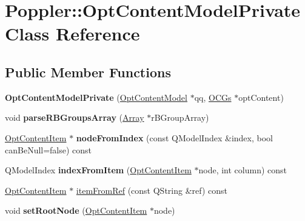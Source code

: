 \hypertarget{class_poppler_1_1_opt_content_model_private}{}\section{Poppler\+:\+:Opt\+Content\+Model\+Private Class Reference}
\label{class_poppler_1_1_opt_content_model_private}
\subsection*{Public Member Functions}
\begin{DoxyCompactItemize}
\item 
\mbox{\label{class_poppler_1_1_opt_content_model_private_a9278859a1265add35b51c51d6019da1e}} 
{\bfseries Opt\+Content\+Model\+Private} (\hyperlink{class_poppler_1_1_opt_content_model}{Opt\+Content\+Model} $\ast$qq, \hyperlink{class_o_c_gs}{O\+C\+Gs} $\ast$opt\+Content)
\item 
\mbox{\label{class_poppler_1_1_opt_content_model_private_ae8ef7bb0e42d99c6a9fc3e884e92d516}} 
void {\bfseries parse\+R\+B\+Groups\+Array} (\hyperlink{class_array}{Array} $\ast$r\+B\+Group\+Array)
\item 
\mbox{\label{class_poppler_1_1_opt_content_model_private_a6db13389af2775cc71da453e7b80dde7}} 
\hyperlink{class_poppler_1_1_opt_content_item}{Opt\+Content\+Item} $\ast$ {\bfseries node\+From\+Index} (const Q\+Model\+Index \&index, bool can\+Be\+Null=false) const
\item 
\mbox{\label{class_poppler_1_1_opt_content_model_private_a70c4327a9faaeb97f629c9f77cc4bcf1}} 
Q\+Model\+Index {\bfseries index\+From\+Item} (\hyperlink{class_poppler_1_1_opt_content_item}{Opt\+Content\+Item} $\ast$node, int column) const
\item 
\hyperlink{class_poppler_1_1_opt_content_item}{Opt\+Content\+Item} $\ast$ \hyperlink{class_poppler_1_1_opt_content_model_private_a4f7f8ce316e9141b44363a2f3e64fa9a}{item\+From\+Ref} (const Q\+String \&ref) const
\item 
\mbox{\label{class_poppler_1_1_opt_content_model_private_abcef1a8001d7e6651273166ef840d4df}} 
void {\bfseries set\+Root\+Node} (\hyperlink{class_poppler_1_1_opt_content_item}{Opt\+Content\+Item} $\ast$node)
\end{DoxyCompactItemize}
